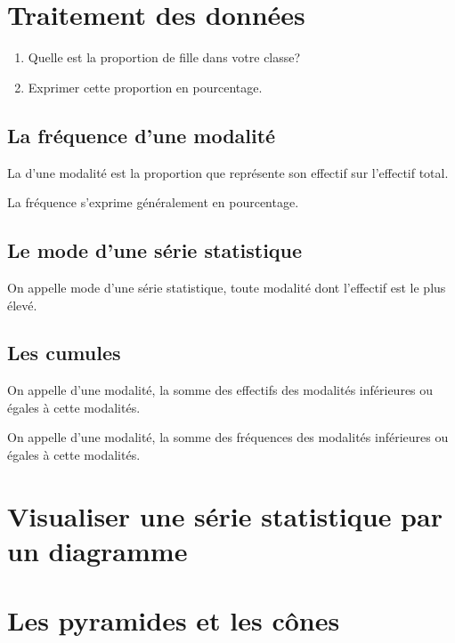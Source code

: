 \documentclass[12pt,a4paper]{report}
\begin{document}
\chapter{Traitement des données} 
\begin{act}
\begin{enumerate}
\item Quelle est la proportion de fille dans votre classe?
\item Exprimer cette proportion en pourcentage.
\end{enumerate}
\end{act}

\section{La fréquence d'une modalité}
\begin{defn}
La  d'une modalité est la proportion que représente son effectif sur l'effectif total.
\end{defn}

\begin{memento}
La fréquence s'exprime généralement en pourcentage.\\
\end{memento}

\section{Le mode d'une série statistique}
\begin{defn}
On appelle mode d'une série statistique, toute modalité dont l'effectif est le plus élevé.
\end{defn}
\section{Les cumules}
\begin{defns}
\item On appelle  d'une modalité, la somme des effectifs des modalités inférieures ou égales à cette modalités.
\item On appelle  d'une modalité, la somme des fréquences des modalités inférieures ou égales à cette modalités.
\end{defns}

\chapter{Visualiser une série statistique par un diagramme}


\chapter{Les pyramides et les cônes}
\end{document}
